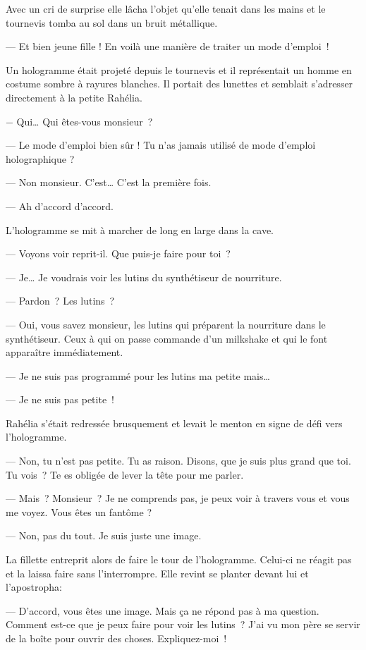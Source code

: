 Avec un cri de surprise elle lâcha l'objet qu'elle tenait dans les mains et le
tournevis tomba au sol dans un bruit métallique.

  — Et bien jeune fille ! En voilà une manière de traiter un mode d'emploi !

Un hologramme était projeté depuis le tournevis et il représentait un homme 
en costume sombre à rayures blanches. Il portait des lunettes et semblait
s'adresser directement à la petite Rahélia.

  − Qui… Qui êtes-vous monsieur ?

  — Le mode d'emploi bien sûr ! Tu n'as jamais utilisé de mode d'emploi
holographique ?

  — Non monsieur. C'est… C'est la première fois.

  — Ah d'accord d'accord.

L'hologramme se mit à marcher de long en large dans la cave.

  — Voyons voir reprit-il. Que puis-je faire pour toi ?

  — Je… Je voudrais voir les lutins du synthétiseur de nourriture.

  — Pardon ? Les lutins ?

  — Oui, vous savez monsieur, les lutins qui préparent la nourriture dans
le synthétiseur. Ceux à qui on passe commande d'un milkshake et qui le font
apparaître immédiatement.

  — Je ne suis pas programmé pour les lutins ma petite mais…

  — Je ne suis pas petite !

Rahélia s'était redressée brusquement et levait le menton en signe de défi vers
l'hologramme.

  — Non, tu n'est pas petite. Tu as raison. Disons, que je suis plus grand
que toi. Tu vois ? Te es obligée de lever la tête pour me parler.

  — Mais ? Monsieur ? Je ne comprends pas, je peux voir à travers vous et
vous me voyez. Vous êtes un fantôme ?

  — Non, pas du tout. Je suis juste une image.

La fillette entreprit alors de faire le tour de l'hologramme. Celui-ci ne réagit
pas et la laissa faire sans l'interrompre. Elle revint se planter devant lui et
l'apostropha:

  — D’accord, vous êtes une image. Mais ça ne répond pas à ma question. Comment
est-ce que je peux faire pour voir les lutins ? J'ai vu mon père se servir de la
boîte pour ouvrir des choses. Expliquez-moi !

